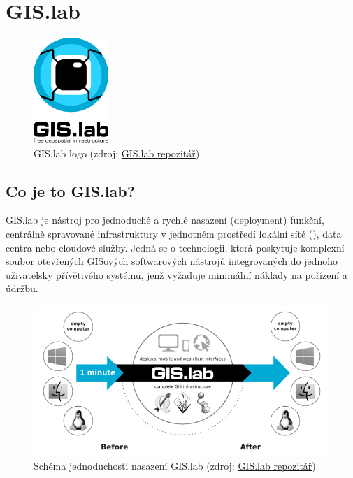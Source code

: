 \chapter{GIS.lab}
\label{2-teorie}

\begin{figure}[H] \centering
    \includegraphics[width=80pt]{./pictures/gislab-logo.png}
    \caption[GIS.lab logo]{GIS.lab logo (zdroj:
	\href{https://github.com/gislab-npo/gislab-doc/blob/master/img/logo.svg}{GIS.lab repozitář})}
	\label{fig:gislab-logo}
\end{figure}

\section{Co je to GIS.lab?}

GIS.lab je nástroj pro jednoduché a rychlé nasazení (deployment)
funkční, centrálně spravované  infrastruktury v jednotném
prostředí lokální sítě (), data centra nebo cloudové
služby. Jedná se o technologii, která poskytuje komplexní soubor
otevřených GISových softwarových nástrojů integrovaných do jednoho
uživatelsky přívětivého systému, jenž vyžaduje minimální náklady na
pořízení a údržbu.

\begin{figure}[H] \centering
    \includegraphics[width=400pt]{./pictures/gislab-schema.png}
    \caption[Schéma jednoduchosti nasazení GIS.lab]{Schéma jednoduchosti nasazení GIS.lab (zdroj:
	\href{https://github.com/gislab-npo/gislab-doc/blob/master/img/general/gislab-schema.png}{GIS.lab repozitář})}
	\label{fig:gislab-schema}
\end{figure}


